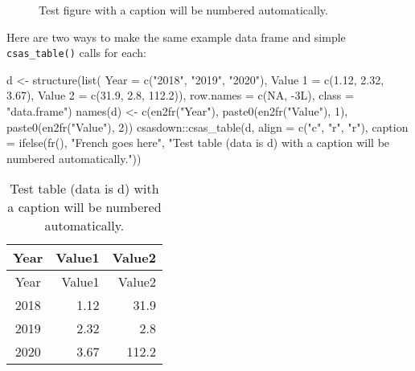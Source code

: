 \documentclass[12pt]{article}\usepackage[]{graphicx}\usepackage[]{color}
\newenvironment{Shaded}{\begin{snugshade}}{\end{snugshade}}
\newcommand{\AttributeTok}[1]{\textcolor[rgb]{0.77,0.63,0.00}{#1}}
\newcommand{\ConstantTok}[1]{\textcolor[rgb]{0.00,0.00,0.00}{#1}}
\newcommand{\DecValTok}[1]{\textcolor[rgb]{0.00,0.00,0.81}{#1}}
\newcommand{\FloatTok}[1]{\textcolor[rgb]{0.00,0.00,0.81}{#1}}
\newcommand{\FunctionTok}[1]{\textcolor[rgb]{0.00,0.00,0.00}{#1}}
\newcommand{\NormalTok}[1]{#1}
\newcommand{\OtherTok}[1]{\textcolor[rgb]{0.56,0.35,0.01}{#1}}
\newcommand{\SpecialCharTok}[1]{\textcolor[rgb]{0.00,0.00,0.00}{#1}}
\newcommand{\StringTok}[1]{\textcolor[rgb]{0.31,0.60,0.02}{#1}}
\begin{document}
\begin{figure}[H]

{\centering {} 

}

\caption{Test figure with a caption will be numbered automatically.}\label{fig:testfig}
\end{figure}
Here are two ways to make the same example data frame and simple \texttt{csas\_table()} calls for each:
\begin{Shaded}
\begin{Highlighting}[]
\NormalTok{d }\OtherTok{\textless{}{-}} \FunctionTok{structure}\NormalTok{(}\FunctionTok{list}\NormalTok{(}
  \AttributeTok{Year =} \FunctionTok{c}\NormalTok{(}\StringTok{"2018"}\NormalTok{, }\StringTok{"2019"}\NormalTok{, }\StringTok{"2020"}\NormalTok{), }
  \StringTok{\textasciigrave{}}\AttributeTok{Value 1}\StringTok{\textasciigrave{}} \OtherTok{=} \FunctionTok{c}\NormalTok{(}\FloatTok{1.12}\NormalTok{, }\FloatTok{2.32}\NormalTok{, }\FloatTok{3.67}\NormalTok{), }
  \StringTok{\textasciigrave{}}\AttributeTok{Value 2}\StringTok{\textasciigrave{}} \OtherTok{=} \FunctionTok{c}\NormalTok{(}\FloatTok{31.9}\NormalTok{, }\FloatTok{2.8}\NormalTok{, }\FloatTok{112.2}\NormalTok{)), }
  \AttributeTok{row.names =} \FunctionTok{c}\NormalTok{(}\ConstantTok{NA}\NormalTok{, }\SpecialCharTok{{-}}\NormalTok{3L), }\AttributeTok{class =} \StringTok{"data.frame"}\NormalTok{)}
  \FunctionTok{names}\NormalTok{(d) }\OtherTok{\textless{}{-}} \FunctionTok{c}\NormalTok{(}\FunctionTok{en2fr}\NormalTok{(}\StringTok{"Year"}\NormalTok{),}
                 \FunctionTok{paste0}\NormalTok{(}\FunctionTok{en2fr}\NormalTok{(}\StringTok{"Value"}\NormalTok{), }\DecValTok{1}\NormalTok{),}
                 \FunctionTok{paste0}\NormalTok{(}\FunctionTok{en2fr}\NormalTok{(}\StringTok{"Value"}\NormalTok{), }\DecValTok{2}\NormalTok{))}
\NormalTok{csasdown}\SpecialCharTok{::}\FunctionTok{csas\_table}\NormalTok{(d,}
  \AttributeTok{align =} \FunctionTok{c}\NormalTok{(}\StringTok{"c"}\NormalTok{, }\StringTok{"r"}\NormalTok{, }\StringTok{"r"}\NormalTok{),}
  \AttributeTok{caption =} \FunctionTok{ifelse}\NormalTok{(}\FunctionTok{fr}\NormalTok{(),}
                   \StringTok{"French goes here"}\NormalTok{,}
                   \StringTok{"Test table (data is d) with a caption will be numbered automatically."}\NormalTok{))}
\end{Highlighting}
\end{Shaded}
\begin{longtable}[]{@{}crr@{}}
\caption{\label{tab:testtab}Test table (data is d) with a caption will be numbered automatically.}\tabularnewline
\toprule()
Year & Value1 & Value2 \\
\midrule()
\endfirsthead
\toprule()
Year & Value1 & Value2 \\
\midrule()
\endhead
2018 & 1.12 & 31.9 \\
2019 & 2.32 & 2.8 \\
2020 & 3.67 & 112.2 \\
\bottomrule()
\end{longtable}
\end{document}

